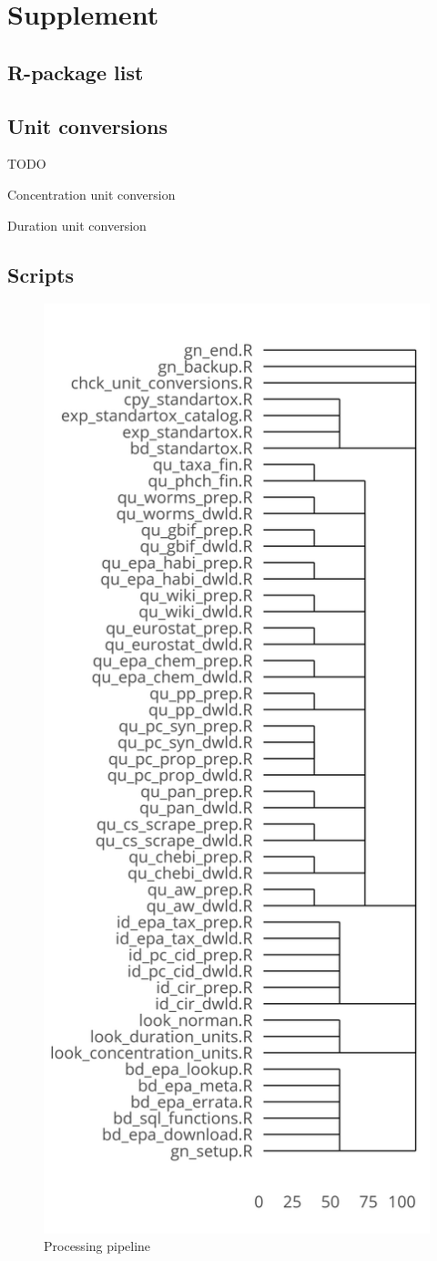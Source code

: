 \section*{Supplement}

\subsection*{R-package list}
\label{list:r-packages}


\subsection*{Unit conversions}
 TODO
\begin{table}
    \caption{Concentration unit conversion}
    \label{sup:conv-concentration}
\end{table}


\begin{table}
    \caption{Duration unit conversion}
    \label{sup:conv-duration}
\end{table}


%

%


\subsection*{Scripts}
\begin{figure}
    \includegraphics[width=0.5\linewidth]{article/figures/scripts_dendrogram.png}
    \caption{Processing pipeline}
    \label{fig:pipeline-tree}
\end{figure}




